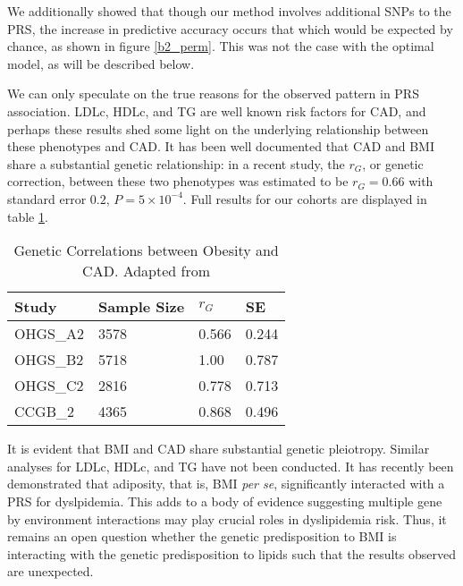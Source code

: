 We additionally showed that though our method involves additional \acp{SNP} to the \ac{PRS}, the increase in predictive accuracy occurs that which would be expected by chance, as shown in figure \ref{b2_perm}. This was not the case with the optimal model, as will be described below. 

We can only speculate on the true reasons for the observed pattern in \ac{PRS} association. \ac{LDLc}, \ac{HDLc}, and \ac{TG} are well known risk factors for \ac{CAD}, and perhaps these results shed some light on the underlying relationship between these phenotypes and \ac{CAD}. It has been well documented that \ac{CAD} and \ac{BMI} share a substantial genetic relationship: in a recent study, the $r_G$, or genetic correction, between these two phenotypes was estimated to be $r_G = 0.66$ with standard error $0.2$, $P = 5 \times 10^{-4}$. \citep{Cole2015a} Full results for our cohorts are displayed in table \ref{rg}. 

\begin{table}[H]
\centering
\caption{Genetic Correlations between Obesity and \ac{CAD}. Adapted from \cite{Cole2015a}}
\label{rg}
\begin{tabular}{llll}
\hline
\textbf{Study} & \textbf{Sample Size} & \textbf{$r_G$} & \textbf{SE} \\ \hline
OHGS\_A2       & 3578                 & 0.566          & 0.244       \\
OHGS\_B2       & 5718                 & 1.00           & 0.787       \\
OHGS\_C2       & 2816                 & 0.778          & 0.713       \\
CCGB\_2        & 4365                 & 0.868          & 0.496       \\ \hline
\end{tabular}
\end{table}

It is evident that \ac{BMI} and \ac{CAD} share substantial genetic pleiotropy. Similar analyses for \ac{LDLc}, \ac{HDLc}, and \ac{TG} have not been conducted. It has recently been demonstrated that adiposity, that is, \ac{BMI} \textit{per se}, significantly interacted with a \ac{PRS} for dyslpidemia. \citep{Cole2014} This adds to a body of evidence suggesting multiple gene by environment interactions may play crucial roles in dyslipidemia risk. \cite{ColeChristopherB.a;NikpayMajidb;McPhersonRutha} Thus, it remains an open question whether the genetic predisposition to \ac{BMI} is interacting with the genetic predisposition to lipids such that the results observed are unexpected.

